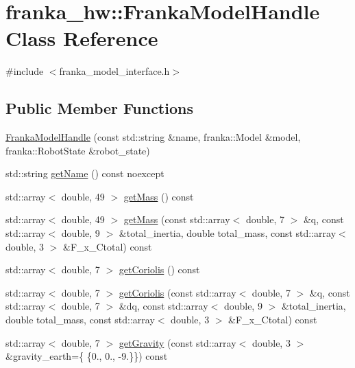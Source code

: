 \hypertarget{classfranka__hw_1_1_franka_model_handle}{}\section{franka\+\_\+hw\+:\+:Franka\+Model\+Handle Class Reference}
\label{classfranka__hw_1_1_franka_model_handle}


{\ttfamily \#include $<$franka\+\_\+model\+\_\+interface.\+h$>$}

\subsection*{Public Member Functions}
\begin{DoxyCompactItemize}
\item 
\hyperlink{classfranka__hw_1_1_franka_model_handle_a814fbbc91e975d22ebd6e156e52944bd}{Franka\+Model\+Handle} (const std\+::string \&name, franka\+::\+Model \&model, franka\+::\+Robot\+State \&robot\+\_\+state)
\item 
std\+::string \hyperlink{classfranka__hw_1_1_franka_model_handle_a88f37f3c1fe73ce7aa9460809847b416}{get\+Name} () const noexcept
\item 
std\+::array$<$ double, 49 $>$ \hyperlink{classfranka__hw_1_1_franka_model_handle_a252d6872afa722e55d2a9cba4ac42088}{get\+Mass} () const
\item 
std\+::array$<$ double, 49 $>$ \hyperlink{classfranka__hw_1_1_franka_model_handle_a72d3355fbea921d7c6fbef17062b69a6}{get\+Mass} (const std\+::array$<$ double, 7 $>$ \&q, const std\+::array$<$ double, 9 $>$ \&total\+\_\+inertia, double total\+\_\+mass, const std\+::array$<$ double, 3 $>$ \&F\+\_\+x\+\_\+\+Ctotal) const
\item 
std\+::array$<$ double, 7 $>$ \hyperlink{classfranka__hw_1_1_franka_model_handle_a8464b57e4652399c19c8abf2a426eebe}{get\+Coriolis} () const
\item 
std\+::array$<$ double, 7 $>$ \hyperlink{classfranka__hw_1_1_franka_model_handle_aa503a5006467f3fd48140a296362e1d1}{get\+Coriolis} (const std\+::array$<$ double, 7 $>$ \&q, const std\+::array$<$ double, 7 $>$ \&dq, const std\+::array$<$ double, 9 $>$ \&total\+\_\+inertia, double total\+\_\+mass, const std\+::array$<$ double, 3 $>$ \&F\+\_\+x\+\_\+\+Ctotal) const
\item 
std\+::array$<$ double, 7 $>$ \hyperlink{classfranka__hw_1_1_franka_model_handle_ac6ad04268fd86d0442733000025c2230}{get\+Gravity} (const std\+::array$<$ double, 3 $>$ \&gravity\+\_\+earth=\{ \{0., 0., -\/9.\}\}) const

\end{DoxyCompactItemize}
